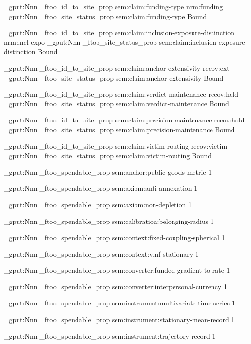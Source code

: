 \prop_gput:Nnn \g_ftoo_id_to_site_prop { sem:claim:funding-type } { nrm:funding }
\prop_gput:Nnn \g_ftoo_site_status_prop { sem:claim:funding-type } { Bound }

\prop_gput:Nnn \g_ftoo_id_to_site_prop { sem:claim:inclusion-exposure-distinction } { nrm:incl-expo }
\prop_gput:Nnn \g_ftoo_site_status_prop { sem:claim:inclusion-exposure-distinction } { Bound }

\prop_gput:Nnn \g_ftoo_id_to_site_prop { sem:claim:anchor-extensivity } { recov:ext }
\prop_gput:Nnn \g_ftoo_site_status_prop { sem:claim:anchor-extensivity } { Bound }

\prop_gput:Nnn \g_ftoo_id_to_site_prop { sem:claim:verdict-maintenance } { recov:held }
\prop_gput:Nnn \g_ftoo_site_status_prop { sem:claim:verdict-maintenance } { Bound }

\prop_gput:Nnn \g_ftoo_id_to_site_prop { sem:claim:precision-maintenance } { recov:hold }
\prop_gput:Nnn \g_ftoo_site_status_prop { sem:claim:precision-maintenance } { Bound }

\prop_gput:Nnn \g_ftoo_id_to_site_prop { sem:claim:victim-routing } { recov:victim }
\prop_gput:Nnn \g_ftoo_site_status_prop { sem:claim:victim-routing } { Bound }



\prop_gput:Nnn \g_ftoo_spendable_prop { sem:anchor:public-goods-metric } { 1 }

\prop_gput:Nnn \g_ftoo_spendable_prop { sem:axiom:anti-annexation } { 1 }

\prop_gput:Nnn \g_ftoo_spendable_prop { sem:axiom:non-depletion } { 1 }

\prop_gput:Nnn \g_ftoo_spendable_prop { sem:calibration:belonging-radius } { 1 }

\prop_gput:Nnn \g_ftoo_spendable_prop { sem:context:fixed-coupling-spherical } { 1 }

\prop_gput:Nnn \g_ftoo_spendable_prop { sem:context:vmf-stationary } { 1 }

\prop_gput:Nnn \g_ftoo_spendable_prop { sem:converter:funded-gradient-to-rate } { 1 }

\prop_gput:Nnn \g_ftoo_spendable_prop { sem:converter:interpersonal-currency } { 1 }

\prop_gput:Nnn \g_ftoo_spendable_prop { sem:instrument:multivariate-time-series } { 1 }

\prop_gput:Nnn \g_ftoo_spendable_prop { sem:instrument:stationary-mean-record } { 1 }

\prop_gput:Nnn \g_ftoo_spendable_prop { sem:instrument:trajectory-record } { 1 }

